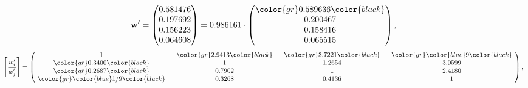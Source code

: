 \begin{example}
\begin{equation*}
\mathbf{w}^{\prime} =
\begin{pmatrix}
0.581476\\
0.197692\\
0.156223\\
0.064608
\end{pmatrix} =
0.986161\cdot
\begin{pmatrix}
\color{gr} 0.589636\color{black} \\
0.200467\\
0.158416\\
0.065515
\end{pmatrix},
\end{equation*}
\begin{equation*}
\left[ \frac{{w}^{\prime}_i}{{w}^{\prime}_j} \right] =
\begin{pmatrix}
$\,\,$ 1 $\,\,$ & $\,\,$\color{gr} 2.9413\color{black} $\,\,$ & $\,\,$\color{gr} 3.7221\color{black} $\,\,$ & $\,\,$\color{gr} \color{blue} 9\color{black} $\,\,$ \\
$\,\,$\color{gr} 0.3400\color{black} $\,\,$ & $\,\,$ 1 $\,\,$ & $\,\,$1.2654$\,\,$ & $\,\,$3.0599  $\,\,$ \\
$\,\,$\color{gr} 0.2687\color{black} $\,\,$ & $\,\,$0.7902$\,\,$ & $\,\,$ 1 $\,\,$ & $\,\,$2.4180 $\,\,$ \\
$\,\,$\color{gr} \color{blue}  1/9\color{black} $\,\,$ & $\,\,$0.3268$\,\,$ & $\,\,$0.4136$\,\,$ & $\,\,$ 1  $\,\,$ \\
\end{pmatrix},
\end{equation*}
\end{example}
\newpage
